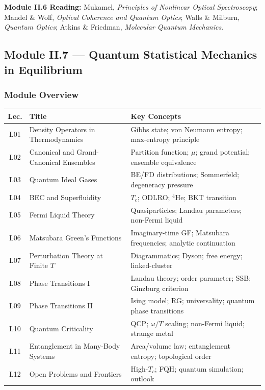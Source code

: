 \documentclass[11pt,a4paper]{article}
\begin{document}
\begin{tcolorbox}[highlightbox]
\textbf{Module II.6 Reading:} Mukamel, \textit{Principles of Nonlinear Optical Spectroscopy}; Mandel \& Wolf, \textit{Optical Coherence and Quantum Optics}; Walls \& Milburn, \textit{Quantum Optics}; Atkins \& Friedman, \textit{Molecular Quantum Mechanics}.
\end{tcolorbox}

\subsection{Module II.7 --- Quantum Statistical Mechanics in Equilibrium}
\label{sec:mod-II7}

\subsubsection*{Module Overview}
\begin{center}
\begin{tabularx}{\textwidth}{clX}
\toprule
\textbf{Lec.} & \textbf{Title} & \textbf{Key Concepts}\\
\midrule
L01 & Density Operators in Thermodynamics & Gibbs state; von Neumann entropy; max-entropy principle\\
L02 & Canonical and Grand-Canonical Ensembles & Partition function; $\mu$; grand potential; ensemble equivalence\\
L03 & Quantum Ideal Gases & BE/FD distributions; Sommerfeld; degeneracy pressure\\
L04 & BEC and Superfluidity & $T_c$; ODLRO; $^4$He; BKT transition\\
L05 & Fermi Liquid Theory & Quasiparticles; Landau parameters; non-Fermi liquid\\
L06 & Matsubara Green's Functions & Imaginary-time GF; Matsubara frequencies; analytic continuation\\
L07 & Perturbation Theory at Finite $T$ & Diagrammatics; Dyson; free energy; linked-cluster\\
L08 & Phase Transitions I & Landau theory; order parameter; SSB; Ginzburg criterion\\
L09 & Phase Transitions II & Ising model; RG; universality; quantum phase transitions\\
L10 & Quantum Criticality & QCP; $\omega/T$ scaling; non-Fermi liquid; strange metal\\
L11 & Entanglement in Many-Body Systems & Area/volume law; entanglement entropy; topological order\\
L12 & Open Problems and Frontiers & High-$T_c$; FQH; quantum simulation; outlook\\
\bottomrule
\end{tabularx}
\end{center}
\end{document}
